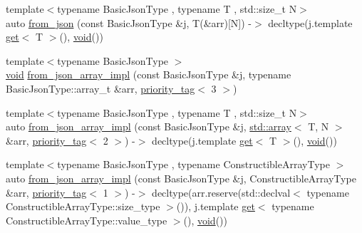 \begin{DoxyCompactItemize}
\item 
{\footnotesize template$<$typename Basic\+Json\+Type , typename T , std\+::size\+\_\+t N$>$ }\\auto \hyperlink{namespacenlohmann_1_1detail_a7deb2db8eed6f1762373dde7a6595760}{from\+\_\+json} (const Basic\+Json\+Type \&j, T(\&arr)\mbox{[}N\mbox{]}) -\/$>$ decltype(j.\+template \hyperlink{namespacenlohmann_1_1detail_acc422c11342b31368f610b6f96fcedc6}{get}$<$ T $>$(), \hyperlink{namespacenlohmann_1_1detail_a59fca69799f6b9e366710cb9043aa77d}{void}())
\item 
{\footnotesize template$<$typename Basic\+Json\+Type $>$ }\\\hyperlink{namespacenlohmann_1_1detail_a59fca69799f6b9e366710cb9043aa77d}{void} \hyperlink{namespacenlohmann_1_1detail_a40f7bb070a60e8ba14fffb9c117fcbd8}{from\+\_\+json\+\_\+array\+\_\+impl} (const Basic\+Json\+Type \&j, typename Basic\+Json\+Type\+::array\+\_\+t \&arr, \hyperlink{structnlohmann_1_1detail_1_1priority__tag}{priority\+\_\+tag}$<$ 3 $>$)
\item 
{\footnotesize template$<$typename Basic\+Json\+Type , typename T , std\+::size\+\_\+t N$>$ }\\auto \hyperlink{namespacenlohmann_1_1detail_aba0ce45ebb69fd2c7132a00f9a56b503}{from\+\_\+json\+\_\+array\+\_\+impl} (const Basic\+Json\+Type \&j, \hyperlink{namespacenlohmann_1_1detail_a1ed8fc6239da25abcaf681d30ace4985af1f713c9e000f5d3f280adbd124df4f5}{std\+::array}$<$ T, N $>$ \&arr, \hyperlink{structnlohmann_1_1detail_1_1priority__tag}{priority\+\_\+tag}$<$ 2 $>$) -\/$>$ decltype(j.\+template \hyperlink{namespacenlohmann_1_1detail_acc422c11342b31368f610b6f96fcedc6}{get}$<$ T $>$(), \hyperlink{namespacenlohmann_1_1detail_a59fca69799f6b9e366710cb9043aa77d}{void}())
\item 
{\footnotesize template$<$typename Basic\+Json\+Type , typename Constructible\+Array\+Type $>$ }\\auto \hyperlink{namespacenlohmann_1_1detail_a464e1246f3df7edea79c3f81ab701edd}{from\+\_\+json\+\_\+array\+\_\+impl} (const Basic\+Json\+Type \&j, Constructible\+Array\+Type \&arr, \hyperlink{structnlohmann_1_1detail_1_1priority__tag}{priority\+\_\+tag}$<$ 1 $>$) -\/$>$ decltype(arr.\+reserve(std\+::declval$<$ typename Constructible\+Array\+Type\+::size\+\_\+type $>$()), j.\+template \hyperlink{namespacenlohmann_1_1detail_acc422c11342b31368f610b6f96fcedc6}{get}$<$ typename Constructible\+Array\+Type\+::value\+\_\+type $>$(), \hyperlink{namespacenlohmann_1_1detail_a59fca69799f6b9e366710cb9043aa77d}{void}())
\item 

\end{DoxyCompactItemize}
